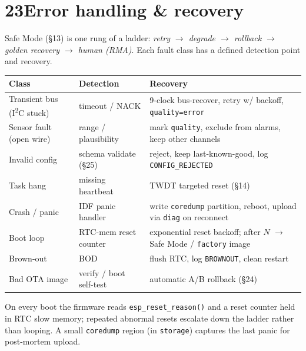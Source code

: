 \section*{23\quad Error handling \& recovery}
Safe Mode (\S13) is one rung of a ladder: \emph{retry $\to$ degrade $\to$ rollback $\to$ golden
recovery $\to$ human (RMA)}. Each fault class has a defined detection point and recovery.
\begin{center}
\renewcommand{\arraystretch}{1.18}\small
\begin{tabularx}{\textwidth}{@{}l l X@{}}
\toprule
\textbf{Class} & \textbf{Detection} & \textbf{Recovery} \\
\midrule
Transient bus (I\textsuperscript{2}C stuck) & timeout / NACK & 9-clock bus-recover, retry w/ backoff, \texttt{quality=error} \\
Sensor fault (open wire) & range / plausibility & mark \texttt{quality}, exclude from alarms, keep other channels \\
Invalid config & schema validate (\S25) & reject, keep last-known-good, log \texttt{CONFIG\_REJECTED} \\
Task hang & missing heartbeat & TWDT targeted reset (\S14) \\
Crash / panic & IDF panic handler & write \texttt{coredump} partition, reboot, upload via \texttt{diag} on reconnect \\
Boot loop & RTC-mem reset counter & exponential reset backoff; after $N$ $\to$ Safe Mode / \texttt{factory} image \\
Brown-out & BOD & flush RTC, log \texttt{BROWNOUT}, clean restart \\
Bad OTA image & verify / boot self-test & automatic A/B rollback (\S24) \\
\bottomrule
\end{tabularx}
\end{center}
\noindent On every boot the firmware reads \texttt{esp\_reset\_reason()} and a reset counter held in
RTC slow memory; repeated abnormal resets escalate down the ladder rather than looping. A small
\texttt{coredump} region (in \texttt{storage}) captures the last panic for post-mortem upload.

